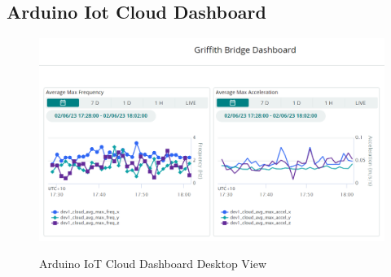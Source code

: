 \subsection{Arduino Iot Cloud Dashboard}
\begin{figure}[H]
	\centering
	\caption{Arduino IoT Cloud Dashboard Desktop View}
	\includegraphics[width=\textwidth]{Sections/Appendix/dashboard.png}
	\label{dashboard}
\end{figure}

